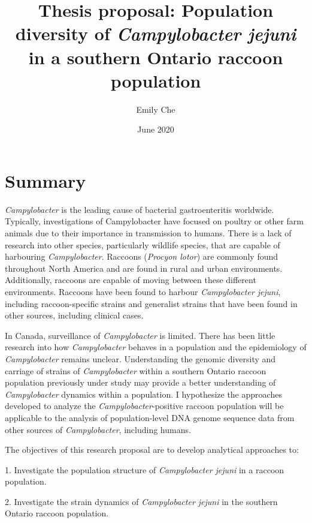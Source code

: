 \documentclass[letterpaper,titlepage,12pt]{article}
\title{Thesis proposal: Population diversity of  \textit{Campylobacter jejuni} in a southern Ontario raccoon population}
\author{Emily Che}
\date{June 2020}
\begin{document}
\maketitle
\linenumbers
\section{Summary}



\textit{Campylobacter} is the leading cause of bacterial gastroenteritis worldwide. Typically, investigations of Campylobacter have focused on poultry or other farm animals due to their importance in transmission to humans. There is a lack of research into other species, particularly wildlife species, that are capable of harbouring \textit{Campylobacter}. Raccoons (\textit{Procyon lotor}) are commonly found throughout North America and are found in rural and urban environments. Additionally, raccoons are capable of moving between these different environments. Raccoons have been found to harbour \textit{Campylobacter jejuni}, including raccoon-specific strains and generalist strains that have been found in other sources, including clinical cases. 

In Canada, surveillance of \textit{Campylobacter} is limited.  There has been little research into how \textit{Campylobacter} behaves in a population and the epidemiology of \textit{Campylobacter} remains unclear. Understanding the genomic diversity and carriage of strains of \textit{Campylobacter} within a southern Ontario raccoon population previously under study may provide a better understanding of \textit{Campylobacter} dynamics within a population. I hypothesize the approaches developed to analyze the \textit{Campylobacter}-positive raccoon population will be applicable to the analysis of population-level DNA genome sequence data from other sources of \textit{Campylobacter}, including humans. 




The objectives of this research proposal are to develop analytical approaches to:

1. Investigate the population structure of \textit{Campylobacter jejuni} in a raccoon population.

2. Investigate the strain dynamics of \textit{Campylobacter jejuni} in the southern Ontario raccoon population.
\end{document}
